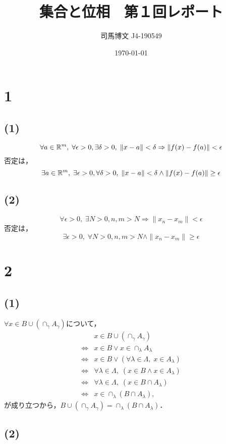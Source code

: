 \documentclass[uplatex, 12pt, dvipdfmx]{jsarticle}
\title{集合と位相　第１回レポート}
\author{司馬博文 J4-190549}
\date{\today}
\begin{document}
\maketitle

\section*{1}

\subsection*{(1)}

\[\forall a\in\mathbb{R}^m,\;\forall\epsilon>0,\exists\delta>0,\;\|x-a\|<\delta\Rightarrow\|f(x)-f(a)\|<\epsilon \]
否定は，
\[ \exists a\in\mathbb{R}^m,\;\exists\epsilon>0,\forall\delta>0,\;\|x-a\|<\delta\land\|f(x)-f(a)\|\ge\epsilon \]

\subsection*{(2)}

\[ \forall\epsilon>0,\;\exists N>0, n,m>N\Rightarrow \|x_n-x_m\|<\epsilon \]
否定は，
\[ \exists\epsilon>0,\;\forall N>0, n,m>N\land \|x_n-x_m\|\ge\epsilon \]

\section*{2}

\subsection*{(1)}

$\forall x\in B\cup(\cap_\gamma A_\gamma)$について，
\begin{align*}
    &x\in B\cup(\cap_\gamma A_\gamma)\\
    \Leftrightarrow&x\in B\lor x\in\cap_\lambda A_\lambda\\
    \Leftrightarrow&x\in B\lor(\forall\lambda\in\Lambda,\; x\in A_\lambda)\\
    \Leftrightarrow&\forall\lambda\in\Lambda,\; (x\in B\land x\in A_\lambda)\\
    \Leftrightarrow&\forall\lambda\in\Lambda,\; (x\in B\cap A_\lambda)\\
    \Leftrightarrow&x\in \cap_\lambda (B\cap A_\lambda),
\end{align*}
が成り立つから，$B\cup(\cap_\gamma A_\gamma)=\cap_\lambda (B\cap A_\lambda)$．

\subsection*{(2)}
\end{document}
